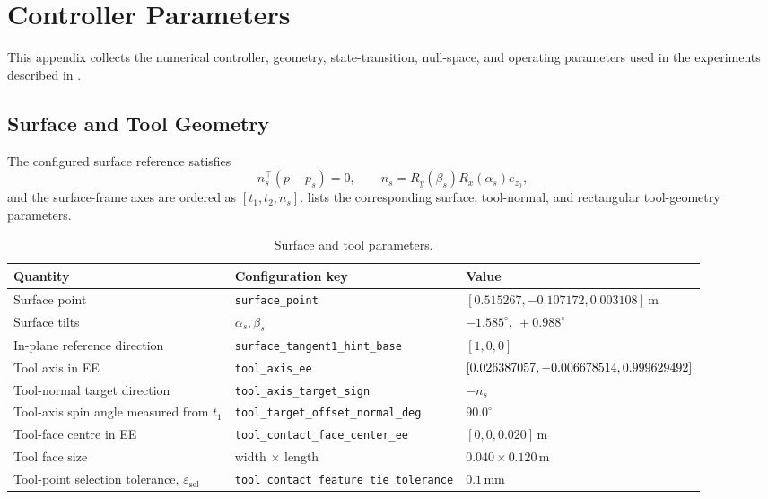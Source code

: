 \chapter{Controller Parameters}
\label{app:controller_parameters}

This appendix collects the numerical controller, geometry, state-transition,
null-space, and operating parameters used in the experiments described in
.

\section{Surface and Tool Geometry}

The configured surface reference satisfies
\[
 n_s^\top(p-p_s)=0,\qquad
 n_s=R_y(\beta_s)R_x(\alpha_s)e_{z_0} ,
\]
and the surface-frame axes are ordered as \([t_1,t_2,n_s]\).
\mbox{} lists the corresponding
surface, tool-normal, and rectangular tool-geometry parameters.

\begin{table}[H]
\centering
\caption{Surface and tool parameters.}
\label{tab:active_surface_tool_parameters}
\small
\begin{tabular}{@{}
>{\raggedright\arraybackslash}p{}
>{\raggedright\arraybackslash}p{}
>{\raggedright\arraybackslash}p{}@{}}
\toprule
Quantity & Configuration key & Value \\
\midrule
Surface point & \texttt{surface\_point} &
  \([0.515267,-0.107172,0.003108]\,\mathrm{m}\) \\
Surface tilts & \(\alpha_s,\beta_s\) & \(-1.585^\circ,\ +0.988^\circ\) \\
In-plane reference direction & \texttt{surface\_tangent1\_hint\_base} &
  \([1,0,0]\) \\
Tool axis in EE & \texttt{tool\_axis\_ee} &
  \([0.026387057,-0.006678514,\newline 0.999629492]\) \\
Tool-normal target direction & \texttt{tool\_axis\_target\_sign} & \(-n_s\) \\
Tool-axis spin angle measured from \(t_1\) &
  \texttt{tool\_target\_offset\_}\newline\texttt{normal\_deg} &
  \(90.0^\circ\) \\
Tool-face centre in EE & \texttt{tool\_contact\_face\_center\_ee} &
  \([0,0,0.020]\,\mathrm{m}\) \\
Tool face size & width \(\times\) length &
  \(0.040\times0.120\,\mathrm{m}\) \\
Tool-point selection tolerance, \(\varepsilon_{\mathrm{sel}}\) &
  \texttt{tool\_contact\_feature\_}\newline\texttt{tie\_tolerance} &
  \(0.1\,\mathrm{mm}\) \\
\bottomrule
\end{tabular}
\end{table}

